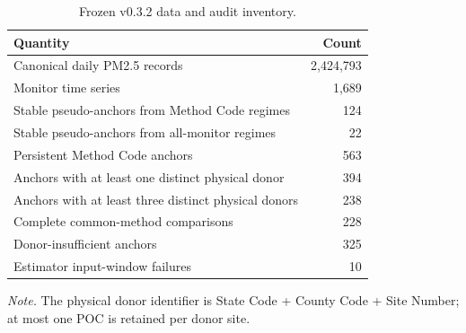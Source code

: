 \begin{table}[tbp]
\centering
\caption{Frozen v0.3.2 data and audit inventory.}
\label{tab:data-summary}
\small
\begin{tabular}{lr}
\toprule
Quantity & Count \\
\midrule
Canonical daily PM2.5 records & 2,424,793 \\
Monitor time series & 1,689 \\
Stable pseudo-anchors from Method Code regimes & 124 \\
Stable pseudo-anchors from all-monitor regimes & 22 \\
Persistent Method Code anchors & 563 \\
Anchors with at least one distinct physical donor & 394 \\
Anchors with at least three distinct physical donors & 238 \\
Complete common-method comparisons & 228 \\
Donor-insufficient anchors & 325 \\
Estimator input-window failures & 10 \\
\bottomrule
\end{tabular}
\par\smallskip
\begin{minipage}{0.94\linewidth}
\footnotesize\textit{Note.} The physical donor identifier is State Code + County Code + Site Number; at most one POC is retained per donor site.
\end{minipage}
\end{table}

